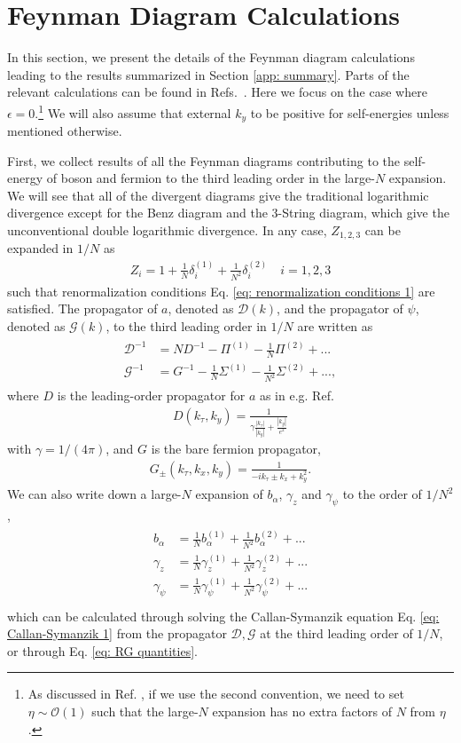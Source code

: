 \documentclass[prx,amsmath,amssymb, notitlepage, onecolumn,
nofootinbib,
superscriptaddress,
longbibliography
]{revtex4-1}
\newcommand{\mc}[1]{\mathcal{#1}}
\newcommand{\beq}{\begin{eqnarray}}
\newcommand{\eeq}{\end{eqnarray}}
\begin{document}
\section{Feynman Diagram Calculations}\label{app: Diagram Calculation}

In this section,
we present the details of the Feynman diagram calculations leading to the results summarized in Section \ref{app: summary}. 
Parts of the relevant calculations can be found 
in Refs.~\cite{Lee2009,Metlitski2010,Mross2010,Zou2020,Holder2015,Holder2015b}. 
Here we focus on the case where $\epsilon=0$.\footnote{As discussed in Ref. \cite{Lee2009}, if we use the second convention, we need to set $\eta\sim\mc{O}(1)$ such that the large-$N$ expansion has no extra factors of $N$ from $\eta$.} 
We will also assume that external $k_y$ to be positive for self-energies unless mentioned otherwise.

First, we collect results of all the Feynman diagrams contributing to the self-energy of boson and fermion to the third leading order in the large-$N$ expansion. We will see that all of the divergent diagrams give the traditional logarithmic divergence except for the Benz diagram and the 3-String diagram, which give the unconventional double logarithmic divergence. 
In any case, $Z_{1,2,3}$  can be expanded in $1/N$ as
\beq
Z_i = 1 + \frac{1}{N}\delta_i^{(1)} + \frac{1}{N^2}\delta_i^{(2)}\quad i=1,2,3
\eeq
such that renormalization conditions Eq. \eqref{eq: renormalization conditions 1} are satisfied. The propagator of $a$, denoted as $\mc{D}(k)$, and the propagator of $\psi$,  denoted as $\mc{G}(k)$, to the third leading order in $1/N$ are written as
\beq
\begin{split}
\mc{D}^{-1} &= N D^{-1} - \Pi^{(1)} -\frac{1}{N}\Pi^{(2)} + ...\\
\mc{G}^{-1} &= G^{-1} - \frac{1}{N}\Sigma^{(1)} - \frac{1}{N^2}\Sigma^{(2)} + ... ,
\end{split}
\eeq
where $D$ is the leading-order propagator for $a$ as in e.g. Ref.~\cite{Metlitski2010}
\beq\label{eq: bare photon propagator 1}
D(k_\tau, k_y)=\frac{1}{\gamma\frac{|k_\tau|}{|k_y|}+\frac{|k_y|}{e^2}}
\eeq
with $\gamma = 1/(4\pi)$, and $G$ is the bare fermion propagator,
\beq\label{eq: bare fermion propagator 1}
G_\pm(k_\tau, k_x, k_y) = \frac{1}{-ik_\tau \pm k_x + k_y^2}.
\eeq
We can also write down a large-$N$ expansion of $b_\alpha$, $\gamma_z$ and $\gamma_\psi$ to the order of $1/N^2$, 
\beq\label{eq: beta function expansion 1}
\begin{split}
	b_{\alpha} & = \frac{1}{N} b_{\alpha}^{(1)} + \frac{1}{N^2} b_{\alpha}^{(2)} + ...\\
	\gamma_z & = \frac{1}{N} \gamma_z^{(1)} + \frac{1}{N^2} \gamma_z^{(2)} + ...\\ 
	\gamma_\psi &= \frac{1}{N} \gamma_\psi^{(1)} +  \frac{1}{N^2} \gamma_\psi^{(2)} + ...\\
\end{split}
\eeq
which can be calculated through solving the Callan-Symanzik equation Eq. \eqref{eq: Callan-Symanzik 1} from the propagator $\mc{D}, \mc{G}$ at the third leading order of $1/N$, or through Eq. \eqref{eq: RG quantities}. 
\end{document}
